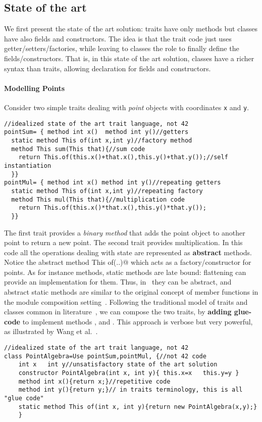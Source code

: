 \subsection{State of the art}
We first present the state of the art solution: 
traits have only methods but classes have also fields and constructors.
The idea is that the trait code just uses getter/setters/factories, while leaving
to classes the role to finally define the fields/constructors. That
is, in this state of the art solution, classes have a richer syntax than traits, allowing
declaration for fields and constructors. 

\paragraph{Modelling Points} Consider two simple 
traits dealing with \emph{point} objects with coordinates \lstinline{x} and
\lstinline{y}.
\saveSpace\saveSpace
\begin{lstlisting}
//idealized state of the art trait language, not 42
pointSum= { method int x()  method int y()//getters
  static method This of(int x,int y)//factory method
  method This sum(This that){//sum code
    return This.of(this.x()+that.x(),this.y()+that.y());//self instantiation
  }}
pointMul= { method int x() method int y()//repeating getters
  static method This of(int x,int y)//repeating factory
  method This mul(This that){//multiplication code
    return This.of(this.x()*that.x(),this.y()*that.y());
  }}
\end{lstlisting}
\saveSpace\saveSpace
The first trait provides a \emph{binary method} that 
adds the point object to another point to return a new point. 
The second trait provides multiplication.
\noindent In this code all the operations dealing with state are represented as {\bf abstract} methods.
Notice the abstract \Q@static method This of(..)@ which acts as a factory/constructor
for points. 
As for instance methods, static methods are late bound:  flattening can provide an implementation for them.
Thus, in \name\ they can be abstract, and abstract static methods are similar to the original concept of member functions in the module composition setting~\cite{ancona2002calculus}.
Following the traditional model of traits and classes common in literature~\cite{ducasse2006traits},
we can compose the two traits, by \textbf{adding glue-code}
to implement methods \Q@x@, \Q@y@ and \Q@of@.
This approach is verbose but very
powerful, as illustrated by Wang et al.~\cite{wang2016classless}.
\saveSpace\saveSpace
\begin{lstlisting}
//idealized state of the art trait language, not 42
class PointAlgebra=Use pointSum,pointMul, {//not 42 code
    int x   int y//unsatisfactory state of the art solution
    constructor PointAlgebra(int x, int y){ this.x=x   this.y=y }
    method int x(){return x;}//repetitive code
    method int y(){return y;}// in traits terminology, this is all "glue code"
    static method This of(int x, int y){return new PointAlgebra(x,y);}
    }
\end{lstlisting}
